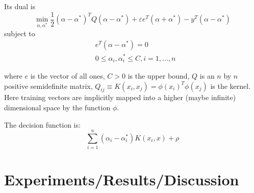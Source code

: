 \documentclass[12]{article}
\begin{document}
Its dual is
\begin{equation*}
\min_{\alpha, \alpha^*} \frac{1}{2} (\alpha - \alpha^*)^T Q (\alpha - \alpha^*) + \varepsilon e^T (\alpha + \alpha^*) - y^T (\alpha - \alpha^*)
\end{equation*}
subject to
\begin{align*}
& e^T (\alpha - \alpha^*) = 0 \\
& 0 \leq \alpha_i, \alpha_i^* \leq C, i=1, ..., n
\end{align*}

where $e$ is the vector of all ones, $C > 0$ is the upper bound,
$Q$ is an $n$ by $n$ positive semidefinite matrix, $Q_{ij} \equiv K(x_i, x_j) =
\phi (x_i)^T \phi (x_j)$ is the kernel. Here training vectors are implicitly mapped into a higher
(maybe infinite) dimensional space by the function $\phi$.

The decision function is:
\begin{equation}
\sum_{i=1}^n (\alpha_i - \alpha_i^*) K(x_i, x) + \rho
\end{equation}

\section*{Experiments/Results/Discussion}
\end{document}
